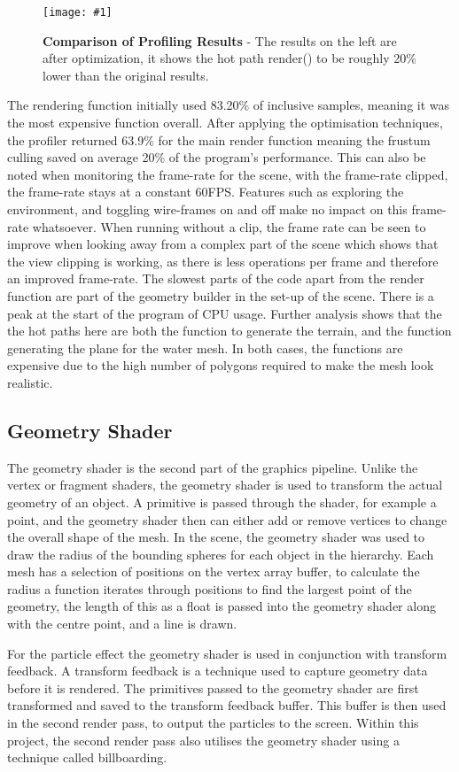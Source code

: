 \documentclass[conference]{acmsiggraph}
\newcommand{\figuremacroW}[4]{
	\begin{figure}[h] %
		\centering
		\texttt{[image: \#1]}
		\caption[#2]{\textbf{#2} - #3}
		\label{fig:#1}
	\end{figure}
}
\begin{document}
\figuremacroW
{compare}
{Comparison of Profiling Results}
{The results on the left are after optimization, it shows the hot path render() to be roughly 20\% lower than the original results.}
{1.0}

The rendering function initially used 83.20\% of inclusive samples, meaning it was the most expensive function overall. After applying the optimisation techniques, the profiler returned 63.9\% for the main render function meaning the frustum culling saved on average 20\% of the program's performance. This can also be noted when monitoring the frame-rate for the scene, with the frame-rate clipped, the frame-rate stays at a constant 60FPS. Features such as exploring the environment, and toggling wire-frames on and off make no impact on this frame-rate whatsoever. When running without a clip, the frame rate can be seen to improve when looking away from a complex part of the scene which shows that the view clipping is working, as there is less operations per frame and therefore an improved frame-rate. The slowest parts of the code apart from the render function are part of the geometry builder in the set-up of the scene. There is a peak at the start of the program of CPU usage. Further analysis shows that the the hot paths here are both the function to generate the terrain, and the function generating the plane for the water mesh. In both cases, the functions are expensive due to the high number of polygons required to make the mesh look realistic. 


\subsection{Geometry Shader}
The geometry shader is the second part of the graphics pipeline. Unlike the vertex or fragment shaders, the geometry shader is used to transform the actual geometry of an object. A primitive is passed through the shader, for example a point, and the geometry shader then can either add or remove vertices to change the overall shape of the mesh. In the scene, the geometry shader was used to draw the radius of the bounding spheres for each object in the hierarchy. Each mesh has a selection of positions on the vertex array buffer, to calculate the radius a function iterates through positions to find the largest point of the geometry, the length of this as a float is passed into the geometry shader along with the centre point, and a line is drawn.

For the particle effect the geometry shader is used in conjunction with transform feedback. A transform feedback is a technique used to capture geometry data before it is rendered. The primitives passed to the geometry shader are first transformed and saved to the transform feedback buffer. This buffer is then used in the second render pass, to output the particles to the screen. Within this project, the second render pass also utilises the geometry shader using a technique called billboarding.
\end{document}
